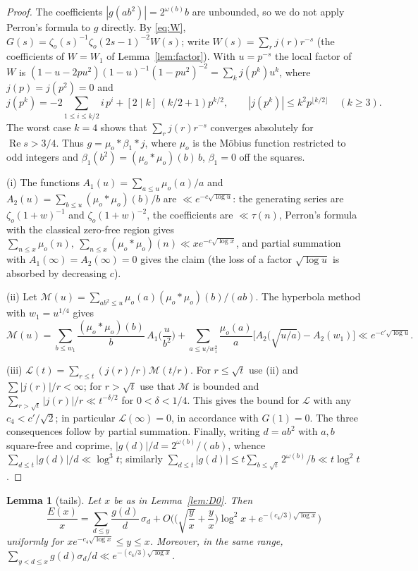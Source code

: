 \documentclass[11pt]{amsart}
\newtheorem{lemma}{Lemma}
\theoremstyle{remark}
\newcommand{\zo}{\zeta_{o}}
\begin{document}
\begin{proof}
The coefficients $|g(ab^2)|=2^{\omega(b)}b$ are unbounded, so we do not apply Perron's formula to $g$ directly. By \eqref{eq:W}, $G(s)=\zo(s)^{-1}\zo(2s-1)^{-2}W(s)$; write $W(s)=\sum_rj(r)r^{-s}$ (the coefficients of $W=W_1$ of Lemma~\ref{lem:factor}). With $u=p^{-s}$ the local factor of $W$ is $(1-u-2pu^2)(1-u)^{-1}(1-pu^2)^{-2}=\sum_kj(p^k)u^k$, where $j(p)=j(p^2)=0$ and
\[
j(p^k)=-2\sum_{1\le i\le k/2}i\,p^i+[2\mid k]\,(k/2+1)p^{k/2},\qquad |j(p^k)|\le k^2p^{\lfloor k/2\rfloor}\quad(k\ge3).
\]
The worst case $k=4$ shows that $\sum_rj(r)r^{-s}$ converges absolutely for $\operatorname{Re}s>3/4$. Thus $g=\mu_o*\beta_1*j$, where $\mu_o$ is the M\"obius function restricted to odd integers and $\beta_1(b^2)=(\mu_o*\mu_o)(b)\,b$, $\beta_1=0$ off the squares.

(i) The functions $A_1(u)=\sum_{a\le u}\mu_o(a)/a$ and $A_2(u)=\sum_{b\le u}(\mu_o*\mu_o)(b)/b$ are $\ll e^{-c\sqrt{\log u}}$: the generating series are $\zo(1+w)^{-1}$ and $\zo(1+w)^{-2}$, the coefficients are $\ll\tau(n)$, Perron's formula with the classical zero-free region gives $\sum_{n\le x}\mu_o(n),\ \sum_{n\le x}(\mu_o*\mu_o)(n)\ll xe^{-c\sqrt{\log x}}$, and partial summation with $A_1(\infty)=A_2(\infty)=0$ gives the claim (the loss of a factor $\sqrt{\log u}$ is absorbed by decreasing $c$).

(ii) Let $\mathcal M(u)=\sum_{ab^2\le u}\mu_o(a)(\mu_o*\mu_o)(b)/(ab)$. The hyperbola method with $w_1=u^{1/4}$ gives
\[
\mathcal M(u)=\sum_{b\le w_1}\frac{(\mu_o*\mu_o)(b)}b\,A_1\Big(\frac u{b^2}\Big)+\sum_{a\le u/w_1^2}\frac{\mu_o(a)}a\Big[A_2\Big(\sqrt{u/a}\Big)-A_2(w_1)\Big]\ll e^{-c'\sqrt{\log u}}.
\]

(iii) $\mathcal L(t)=\sum_{r\le t}(j(r)/r)\mathcal M(t/r)$. For $r\le\sqrt t$ use (ii) and $\sum|j(r)|/r<\infty$; for $r>\sqrt t$ use that $\mathcal M$ is bounded and $\sum_{r>\sqrt t}|j(r)|/r\ll t^{-\delta/2}$ for $0<\delta<1/4$. This gives the bound for $\mathcal L$ with any $c_4<c'/\sqrt2$; in particular $\mathcal L(\infty)=0$, in accordance with $G(1)=0$. The three consequences follow by partial summation. Finally, writing $d=ab^2$ with $a,b$ square-free and coprime, $|g(d)|/d=2^{\omega(b)}/(ab)$, whence $\sum_{d\le t}|g(d)|/d\ll\log^3t$; similarly $\sum_{d\le t}|g(d)|\le t\sum_{b\le\sqrt t}2^{\omega(b)}/b\ll t\log^2t$.
\end{proof}

\begin{lemma}[tails]\label{lem:D1b}
Let $x$ be as in Lemma~\ref{lem:D0}. Then
\[
\frac{E(x)}x=\sum_{d\le y}\frac{g(d)}d\,\sigma_d+O\Big(\Big(\sqrt{\frac yx}+\frac yx\Big)\log^2x+e^{-(c_4/3)\sqrt{\log x}}\Big)
\]
uniformly for $xe^{-c_4\sqrt{\log x}}\le y\le x$. Moreover, in the same range, $\sum_{y<d\le x}g(d)\sigma_d/d\ll e^{-(c_4/3)\sqrt{\log x}}$.
\end{lemma}
\end{document}
